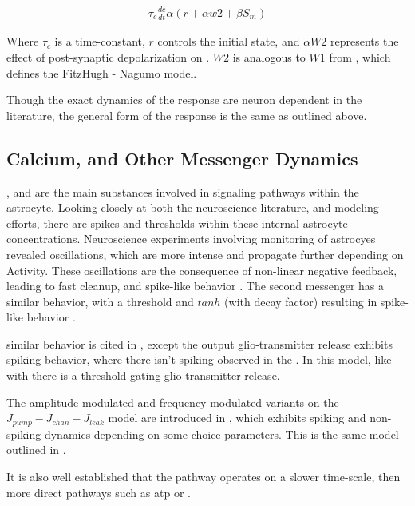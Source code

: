     \begin{align}
      \tau_c \frac{dc}{dt} \alpha (r + \alpha w2 + \beta S_m) \label{eq:kp_path_fn}
    \end{align}

    Where $\tau_c$ is a time-constant, $r$ controls the initial state, and
    $\alpha W2$ represents the effect of post-synaptic depolarization on
    \ca. $W2$ is analogous to $W1$ from , which
    defines the FitzHugh - Nagumo model.

    Though the exact dynamics of the response are neuron dependent in the
    literature, the general form of the response is the same as outlined above.
    
    \subsection{Calcium, and Other Messenger Dynamics}
    \ca, \ipt and \kp are the main substances involved in signaling pathways
    within the astrocyte. Looking closely at both the neuroscience literature,
    and modeling efforts, there are spikes and thresholds within these internal
    astrocyte concentrations. Neuroscience experiments involving monitoring of
    astrocyes revealed oscillations, which are more intense and propagate
    further depending on Activity. These oscillations are the consequence of
    non-linear negative feedback, leading to fast cleanup, and spike-like
    behavior \parencite{postnov_2009}. The second messenger \ipt has a similar
    behavior, with a threshold and $tanh$ (with decay factor) resulting in
    spike-like behavior \parencite{postnov_2009}.

    similar behavior is cited in \parencite{wade_2011}, except the output
    glio-transmitter release exhibits spiking behavior, where there isn't
    spiking observed in the \ca. In this model, like with
    \parencite{postnov_2009} there is a threshold gating glio-transmitter
    release.

    The amplitude modulated and frequency modulated variants on the $J_{pump} -
    J_{chan} - J_{leak}$ model are introduced in \parencite{pitta_2009}, which
    exhibits spiking and non-spiking \ca dynamics depending on some choice
    parameters. This is the same model outlined in \parencite{wade_2011}.

    It is also well established that the \ipt pathway operates on a slower
    time-scale, then more direct pathways such as \gls{atp} or \kp
    \parencite{postnov_2009, bassam_2015}.

